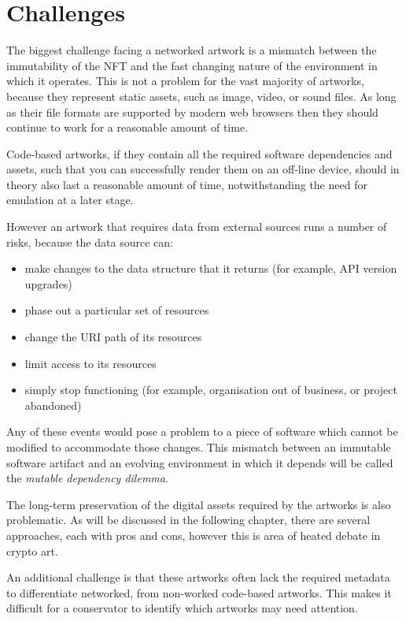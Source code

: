 \section{Challenges}
\label{sec:challenges}

The biggest challenge facing a networked artwork is a mismatch between the immutability of the NFT and the fast changing nature of the environment in which it operates. This is not a problem for the vast majority of artworks, because they represent static assets, such as image, video, or sound files. As long as their file formats are supported by modern web browsers then they should continue to work for a reasonable amount of time.

Code-based artworks, if they contain all the required software dependencies and assets, such that you can successfully render them on an off-line device, should in theory also last a reasonable amount of time, notwithstanding the need for emulation at a later stage.

However an artwork that requires data from external sources runs a number of risks, because the data source can:

\begin{itemize}
    \item make changes to the data structure that it returns (for example, API version upgrades)
    \item phase out a particular set of resources
    \item change the URI path of its resources
    \item limit access to its resources
    \item simply stop functioning (for example, organisation out of business, or project abandoned)
\end{itemize}

Any of these events would pose a problem to a piece of software which cannot be modified to accommodate those changes. This mismatch between an immutable software artifact and an evolving environment in which it depends will be called the \emph{mutable dependency dilemma}.

The long-term preservation of the digital assets required by the artworks is also problematic. As will be discussed in the following chapter, there are several approaches, each with pros and cons, however this is area of heated debate in crypto art.

An additional challenge is that these artworks often lack the required metadata to differentiate networked, from non-worked code-based artworks. This makes it difficult for a conservator to identify which artworks may need attention.

